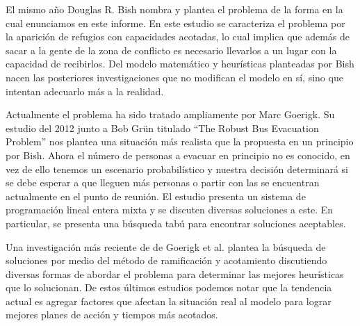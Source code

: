 \documentclass[letter, 10pt]{article}
\begin{document}
    El mismo año Douglas R. Bish\cite{bish2011planning} nombra y plantea el
    problema de la forma en la cual enunciamos en este informe. En este estudio
    se caracteriza el problema por la aparición de refugios con capacidades
    acotadas, lo cual implica que además de sacar a la gente de la zona de
    conflicto es necesario llevarlos a un lugar con la capacidad de recibirlos.
    Del modelo matemático y heurísticas planteadas por Bish nacen las posteriores
    investigaciones que no modifican el modelo en sí, sino que intentan
    adecuarlo más a la realidad.

    Actualmente el problema ha sido tratado ampliamente por Marc Goerigk. Su
    estudio del 2012 junto a Bob Grün titulado ``The Robust Bus
    Evacuation Problem''\cite{goerigk2012robust} nos plantea una situación más
    realista que la propuesta en un principio por Bish. Ahora el número de
    personas a evacuar en principio no es conocido, en vez de ello tenemos un
    escenario probabilístico y nuestra decisión determinará si se debe esperar a
    que lleguen más personas o partir con las se encuentran actualmente en el
    punto de reunión. El estudio presenta un sistema de programación lineal
    entera mixta y se discuten diversas soluciones a este. En particular, se
    presenta una búsqueda tabú para encontrar soluciones aceptables.

    Una investigación más reciente de de Goerigk et al.\cite{goerigk2013branch}
    plantea la búsqueda de soluciones por medio del método de ramificación y
    acotamiento discutiendo diversas formas de abordar el problema para
    determinar las mejores heurísticas que lo solucionan. De estos últimos
    estudios podemos notar que la tendencia actual es agregar factores que
    afectan la situación real al modelo para lograr mejores planes de acción y
    tiempos más acotados.
\end{document}

